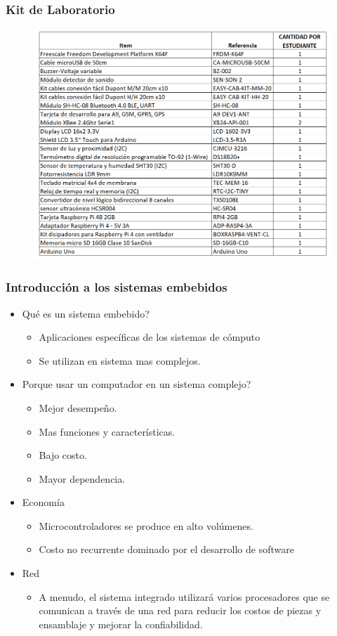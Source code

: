 \documentclass[10.5pt,scale=1.0,t,aspectratio=169,hyperref={pdfpagelabels=false}]{beamer}
\begin{document}
\begin{frame}
	\frametitle{Kit de Laboratorio}
	\begin{figure}
		\centering
		\includegraphics[scale=0.5]{KitLabEmbebidos}
	\end{figure}
\end{frame}
\begin{frame}
	\frametitle{Introducción a los sistemas embebidos}
	\begin{itemize}
		\item \textcolor{BlueLight}{Qué es un sistema embebido?} 
		\begin{itemize}
			\item Aplicaciones específicas de los sistemas de cómputo
			\item Se utilizan en sistema mas complejos.
		\end{itemize}
		\item \textcolor{BlueLight}{Porque usar un computador en un sistema complejo?}
		\begin{itemize}
			\item Mejor desempeño.
			\item Mas funciones y características.
			\item Bajo costo.
			\item Mayor dependencia.
		\end{itemize}
		\item \textcolor{BlueLight}{Economía}
		\begin{itemize}
			\item Microcontroladores se produce en alto volúmenes. 
			\item Costo no recurrente dominado por el desarrollo de software
		\end{itemize}
		\item\textcolor{BlueLight}{Red}
		\begin{itemize}
			\item A menudo, el sistema integrado utilizará varios procesadores que se comunican a través de una red para reducir los costos de piezas y ensamblaje y mejorar la confiabilidad.
		\end{itemize}
	\end{itemize}
\end{frame}
\end{document}
